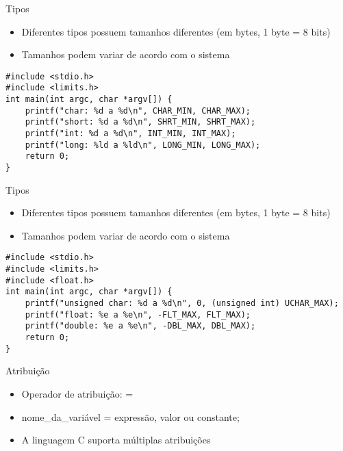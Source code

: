 \documentclass[t, aspectratio=169]{beamer}
\begin{document}
\begin{frame}[label={sec:org307aae1},fragile]{Tipos}
 \begin{itemize}
\item Diferentes tipos possuem tamanhos diferentes (em \alert{bytes}, 1 byte = 8 bits)
\item Tamanhos podem variar de acordo com o sistema
\end{itemize}

\begin{verbatim}
#include <stdio.h>
#include <limits.h>
int main(int argc, char *argv[]) {
    printf("char: %d a %d\n", CHAR_MIN, CHAR_MAX);
    printf("short: %d a %d\n", SHRT_MIN, SHRT_MAX);
    printf("int: %d a %d\n", INT_MIN, INT_MAX);
    printf("long: %ld a %ld\n", LONG_MIN, LONG_MAX);
    return 0;
}
\end{verbatim}
\end{frame}

\begin{frame}[label={sec:org5159cda},fragile]{Tipos}
 \begin{itemize}
\item Diferentes tipos possuem tamanhos diferentes (em \alert{bytes}, 1 byte = 8 bits)
\item Tamanhos podem variar de acordo com o sistema
\end{itemize}

\begin{verbatim}
#include <stdio.h>
#include <limits.h>
#include <float.h>
int main(int argc, char *argv[]) {
    printf("unsigned char: %d a %d\n", 0, (unsigned int) UCHAR_MAX);
    printf("float: %e a %e\n", -FLT_MAX, FLT_MAX);
    printf("double: %e a %e\n", -DBL_MAX, DBL_MAX);
    return 0;
}
\end{verbatim}
\end{frame}

\begin{frame}[label={sec:org5c2a28c}]{Atribuição}
\begin{itemize}
\item Operador de atribuição: \alert{=}
\item \alert{\color{highlight}nome\_da\_variável \color{black}= \color{blue!80}expressão, valor ou constante;}
\item A linguagem C suporta múltiplas atribuições
\end{itemize}
\end{frame}
\end{document}
